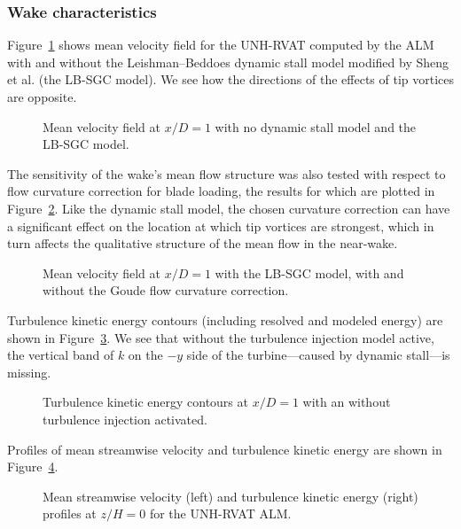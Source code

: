 \subsubsection{Wake characteristics}

Figure~\ref{fig:RVAT-ALM-meancontquiv-DS} shows mean velocity field for the
UNH-RVAT computed by the ALM with and without the Leishman--Beddoes dynamic
stall model modified by Sheng et al. (the LB-SGC model). We see how the
directions of the effects of tip vortices are opposite.

\begin{figure}
    \caption{Mean velocity field at $x/D=1$ with no dynamic stall model and the
        LB-SGC model.}
    
    \label{fig:RVAT-ALM-meancontquiv-DS}
\end{figure}

The sensitivity of the wake's mean flow structure was also tested with respect
to flow curvature correction for blade loading, the results for which are
plotted in Figure~\ref{fig:RVAT-ALM-flow-curvature}. Like the dynamic stall
model, the chosen curvature correction can have a significant effect on the
location at which tip vortices are strongest, which in turn affects the
qualitative structure of the mean flow in the near-wake.

\begin{figure}
    \caption{Mean velocity field at $x/D=1$ with the LB-SGC model, with and
        without the Goude flow curvature correction.}
    
    \label{fig:RVAT-ALM-flow-curvature}
\end{figure}

Turbulence kinetic energy contours (including resolved and modeled energy) are
shown in Figure~\ref{fig:RVAT-ALM-kcont}. We see that without the turbulence
injection model active, the vertical band of $k$ on the $-y$ side of the
turbine---caused by dynamic stall---is missing.

\begin{figure}
    \caption{Turbulence kinetic energy contours at $x/D=1$ with an without
        turbulence injection activated.}
    
    \label{fig:RVAT-ALM-kcont}
\end{figure}

Profiles of mean streamwise velocity and turbulence kinetic energy are shown in
Figure~\ref{fig:RVAT-ALM-profiles}.

\begin{figure}
    \centering
    
    \caption{Mean streamwise velocity (left) and turbulence kinetic energy
        (right) profiles at $z/H=0$ for the UNH-RVAT ALM.}
    
    \label{fig:RVAT-ALM-profiles}
\end{figure}


